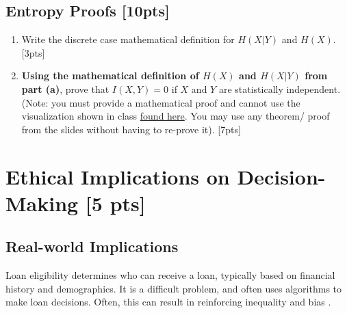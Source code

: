 \documentclass{article}
\begin{document}
\newpage

\subsection{Entropy Proofs [10pts]}

\begin{enumerate}[label=(\alph*)]
    \item Write the discrete case mathematical definition for $H(X|Y)$ and $H(X)$. [3pts]
    \item \textbf{Using the mathematical definition of $H(X)$ and $H(X|Y)$ from part (a)}, prove that $I(X,Y) = 0$ if $X$ and $Y$ are statistically independent. (Note: you must provide a mathematical proof and cannot use the visualization shown in class \href{https://mahdi-roozbahani.github.io/CS46417641-summer2022/other/CEandMI_Illustration.jpg}{found here}. You may use any theorem/ proof from the slides without having to re-prove it). [7pts] \\
    \newline
\end{enumerate}

\newpage

\section{Ethical Implications on Decision-Making [5 pts]}
\subsection*{Real-world Implications}
Loan eligibility determines who can receive a loan, typically based on financial history and demographics. It is a difficult problem, and often uses algorithms to make loan decisions. Often, this can result in reinforcing inequality and bias \cite{oneil}.\\
\end{document}
